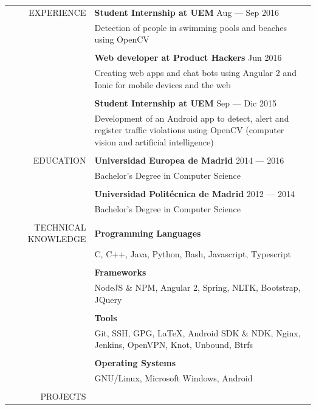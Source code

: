 \documentclass[a4paper, 11pt]{article}
\begin{document}
    \begin{longtable}{rp{11cm}}
        EXPERIENCE
        & {\bf Student Internship at UEM} \hfill Aug --- Sep 2016\\
        & Detection of people in swimming pools and beaches using OpenCV\\\\
        & {\bf Web developer at Product Hackers} \hfill Jun 2016\\
        & Creating web apps and chat bots using Angular 2 and Ionic for mobile devices and the web\\\\
        & {\bf Student Internship at UEM} \hfill Sep --- Dic 2015\\
        &  Development of an Android app to detect, alert and register traffic violations using OpenCV (computer vision and artificial intelligence)\\
        \\
        EDUCATION
        & {\bf Universidad Europea de Madrid} \hfill 2014 --- 2016\\
        & Bachelor's Degree in Computer Science\\\\
        & {\bf Universidad Politécnica de Madrid} \hfill 2012 --- 2014\\
        & Bachelor's Degree in Computer Science\\\\
        TECHNICAL KNOWLEDGE
        & {\bf Programming Languages}\\
        & C, C++, Java, Python, Bash, Javascript, Typescript\\\\
        & {\bf Frameworks}\\
        & NodeJS \& NPM, Angular 2, Spring, NLTK, Bootstrap, JQuery\\\\
        & {\bf Tools}\\
        & Git, SSH, GPG, \LaTeX, Android SDK \& NDK, Nginx, Jenkins, OpenVPN, Knot, Unbound, Btrfs\\\\
        & {\bf Operating Systems}\\
        & GNU/Linux, Microsoft Windows, Android\\
        \\
        PROJECTS
        & \vspace{-8mm}
        \begin{itemize}[leftmargin=0cm,label={}]

\end{itemize}
\end{longtable}
\end{document}
